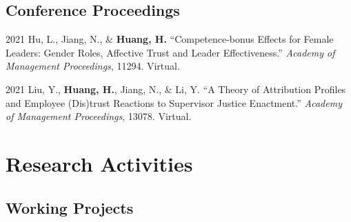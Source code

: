 \documentclass[11pt,letterpaper]{report} %
\begin{document}






    \subsection*{Conference Proceedings}

    \begin{tablist}

        \item[2021] \tab{}Hu, L., Jiang, N., \& \textbf{Huang, H.} \enquote{Competence-bonus Effects for Female Leaders: Gender Roles, Affective Trust and Leader Effectiveness.} \textit{Academy of Management Proceedings}, 11294. Virtual.

        \item[2021] \tab{}Liu, Y., \textbf{Huang, H.}, Jiang, N., \& Li, Y. \enquote{A Theory of Attribution Profiles and Employee (Dis)trust Reactions to Supervisor Justice Enactment.} \textit{Academy of Management Proceedings}, 13078. Virtual.


    \end{tablist}

    \section*{Research Activities}
    \subsection*{Working Projects}
\end{document}
